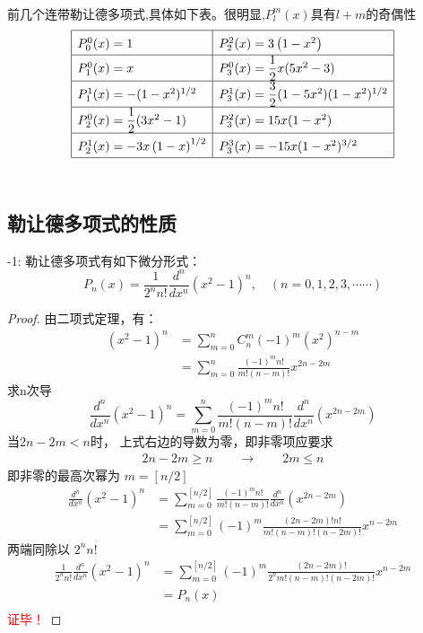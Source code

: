 	~~\\ 
	前几个连带勒让德多项式,具体如下表。很明显,$P^m_{l}(x)$具有$l+m$的奇偶性 
	$$\renewcommand\arraystretch{1.6}
	\begin{array}{|l|l|}
		\hline P^0_{0}(x)=1 & P^2_{2}(x)=3\left(1-x^2\right)\\
		\hline P^0_{1}(x)=x & P^0_{3}(x)=\dfrac{1}{2}x(5x^2-3) \\
		\hline P^1_{1}(x)=-(1-x^2)^{1/2} & P^1_{3}(x)=\dfrac{3}{2}(1-5x^2)(1-x^2)^{1/2} \\
		\hline P^0_{2}(x)= \dfrac{1}{2}(3x^2-1) & P^2_{3}(x)=15 x(1-x^2)\\ 
		\hline P^1_{2}(x)=- 3x\left(1-x\right)^{1/2}  &P^3_{3}(x)= -15 x(1-x^2)^{3/2} \\
		\hline
	\end{array}$$
	~~\\ 
	
	
	\subsection{勒让德多项式的性质}
	
	\begin{proposition}-1:
		勒让德多项式有如下微分形式：
		\begin{equation*}
			P_{n}(x)=\frac{1}{2^{n} n !} \frac{d^{n}}{d x^{n}}\left(x^{2}-1\right)^{n}, \quad(n=0,1,2,3, \cdots \cdots)
		\end{equation*}
	\end{proposition}
	\begin{proof}
		由二项式定理，有：
		$$\begin{aligned}
			\left(x^{2}-1\right)^{n}&=\sum_{m=0}^{n} C_{n}^{m}(-1)^{m}\left(x^{2}\right)^{n-m}\\
			&=\sum_{m=0}^{n} \frac{(-1)^{m} n !}{m !(n-m) !} x^{2 n-2 m}
		\end{aligned}$$
		求n次导
		\begin{equation*}
			\frac{d^{n}}{d x^{n}}\left(x^{2}-1\right)^{n}=\sum_{m=0}^{n} \frac{(-1)^{m} n !}{m !(n-m) !} \frac{d^{n}}{d x^{n}}\left(x^{2 n-2 m}\right)
		\end{equation*}	
		当$2n-2m<n$时， 上式右边的导数为零，即非零项应要求
		\[
			\begin{aligned}
				2n-2m \ge n \qquad \to \qquad 
				2m \le n 
			\end{aligned}
		\]
		即非零的最高次幂为 $m=[n/2]$
		\begin{align*}
			\frac{d^{n}}{d x^{n}}\left(x^{2}-1\right)^{n}&=\sum_{m=0}^{[n/2]} \frac{(-1)^{m} n !}{m !(n-m) !} \frac{d^{n}}{d x^{n}}\left(x^{2 n-2 m}\right)\\
			&=\sum_{m=0}^{[n / 2]}(-1)^{m} \frac{(2 n-2 m) ! n!}{ m !(n-m) !(n-2 m) !} x^{n-2 m}
		\end{align*}	
		两端同除以 $2^{n} n !$
		\begin{align*}
			\frac{1}{2^{n} n !} \frac{d^{n}}{d x^{n}}\left(x^{2}-1\right)^{n} &= \sum_{m=0}^{[n / 2]}(-1)^{m} \frac{(2 n-2 m) !}{2^{n} m !(n-m) !(n-2 m) !} x^{n-2 m}\\
			&=P_n(x)\\
		\end{align*}
	\textcolor{red}{证毕！}
	\end{proof}
	
